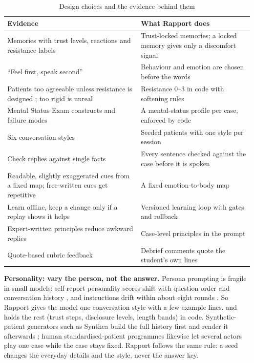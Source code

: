 \documentclass[10pt]{article}
\begin{document}
\begin{table}[htbp]
\caption{Design choices and the evidence behind them}
\label{p4:tab:built}
\centering
\scriptsize
\begin{tabularx}{\linewidth}{@{}YY@{}}
\toprule
Evidence & What Rapport does\\
\midrule
Memories with trust levels, reactions and resistance labels \cite{sabour2026patientact} & Trust-locked memories; a locked memory gives
only a discomfort signal\\
``Feel first, speak second'' \cite{sabour2026patientact} & Behaviour and emotion are chosen before the words\\
Patients too agreeable unless resistance is designed \cite{steenstra2025scaffolding,lee2025psyche}; too rigid is unreal
\cite{bodonhelyi2025modeling} & Resistance 0--3 in code with softening rules\\
Mental Status Exam constructs and failure modes \cite{lee2025psyche} & A mental-status profile per case, enforced by code\\
Six conversation styles \cite{wang2024patient} & Seeded patients with one style per session\\
Check replies against single facts \cite{lai2025patientzero} & Every sentence checked against the case before it is spoken\\
Readable, slightly exaggerated cues from a fixed map; free-written cues get repetitive \cite{haut2025ai,bodonhelyi2025modeling} & A fixed
emotion-to-body map\\
Learn offline, keep a change only if a replay shows it helps \cite{du2024llms,li2024agent,agrawal2025gepa} & Versioned learning loop with gates
and rollback\\
Expert-written principles reduce awkward replies \cite{louie2024roleplaydoh} & Case-level principles in the prompt\\
Quote-based rubric feedback \cite{hicke2025medsimai} & Debrief comments quote the student's own lines\\
\bottomrule
\end{tabularx}
\end{table}

\textbf{Personality: vary the person, not the answer.} Persona prompting is fragile in small models: self-report personality scores shift with
question order and conversation history \cite{tosato2025persist}, and instructions drift within about eight rounds \cite{li2024instruction}.
So Rapport gives the model one conversation style with a few example lines, and holds the rest (trust steps, disclosure levels, length bands)
in code. Synthetic-patient generators such as Synthea build the full history first and render it afterwards \cite{walonoski2018synthea}; human
standardised-patient programmes likewise let several actors play one case while the case stays fixed. Rapport follows the same rule: a seed
changes the everyday details and the style, never the answer key.
\end{document}
